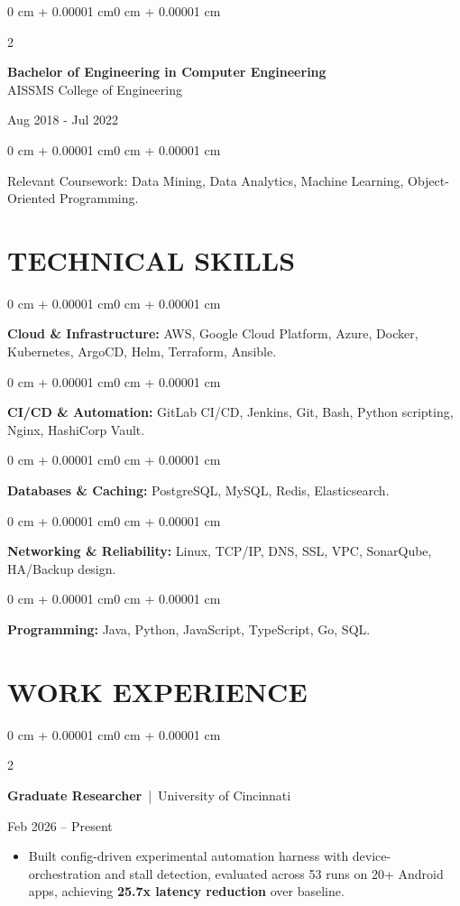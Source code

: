 \documentclass[10pt, letterpaper]{article}
\newenvironment{highlights}{
    \begin{itemize}[
        topsep=0.10 cm,
        parsep=0.06 cm,
        partopsep=0pt,
        itemsep=0.06 cm,
        leftmargin=12pt
    ]
}{
    \end{itemize}
}
\newenvironment{onecolentry}{
    \begin{adjustwidth}{0 cm + 0.00001 cm}{0 cm + 0.00001 cm}
}{
    \end{adjustwidth}
}
\newenvironment{twocolentry}[2][]{
    \onecolentry
    \def\secondColumn{#2}
    \setcolumnwidth{\fill, 4.5 cm}
    \begin{paracol}{2}
}{
    \switchcolumn \raggedleft \secondColumn
    \end{paracol}
    \endonecolentry
}
\begin{document}
\begin{twocolentry}{
    Aug 2018 - Jul 2022
}
    \textbf{Bachelor of Engineering in Computer Engineering} \\
    AISSMS College of Engineering
\end{twocolentry}
\begin{onecolentry}
Relevant Coursework: Data Mining, Data Analytics, Machine Learning, Object-Oriented Programming.
\end{onecolentry}
\section{TECHNICAL SKILLS}
\begin{onecolentry}
\textbf{Cloud \& Infrastructure:} AWS, Google Cloud Platform, Azure, Docker, Kubernetes, ArgoCD, Helm, Terraform, Ansible.
\end{onecolentry}
\vspace{0.06 cm}
\begin{onecolentry}
\textbf{CI/CD \& Automation:} GitLab CI/CD, Jenkins, Git, Bash, Python scripting, Nginx, HashiCorp Vault.
\end{onecolentry}
\vspace{0.06 cm}
\begin{onecolentry}
\textbf{Databases \& Caching:} PostgreSQL, MySQL, Redis, Elasticsearch.
\end{onecolentry}
\vspace{0.06 cm}
\begin{onecolentry}
\textbf{Networking \& Reliability:} Linux, TCP/IP, DNS, SSL, VPC, SonarQube, HA/Backup design.
\end{onecolentry}
\vspace{0.06 cm}
\begin{onecolentry}
\textbf{Programming:} Java, Python, JavaScript, TypeScript, Go, SQL.
\end{onecolentry}

\section{WORK EXPERIENCE}
\begin{twocolentry}{Feb 2026 -- Present}
\textbf{Graduate Researcher} \,|\, University of Cincinnati
\end{twocolentry}
\begin{highlights}
  \item Built config-driven experimental automation harness with device-orchestration and stall detection, evaluated across 53 runs on 20+ Android apps, achieving \textbf{25.7x latency reduction} over baseline.
\end{highlights}
\end{document}
